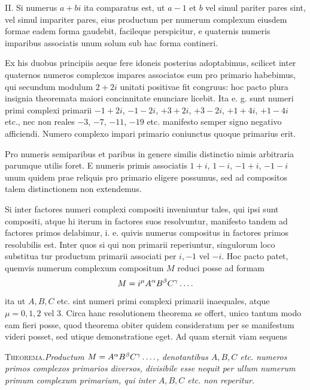 II. Si numerus $a+bi$ ita comparatus est, ut $a-1$ et $b$ vel simul pariter pares sint, vel simul impariter pares, eius productum per numerum complexum eiusdem formae eadem forma gaudebit, facileque perspicitur, e quaternis numeris imparibus associatis unum solum sub hac forma contineri.

Ex his duobus principiis aeque fere idoneis posterius adoptabimus, scilicet inter quaternos numeros complexos impares associatos eum pro primario habebimus, qui secundum modulum $2+2i$ unitati positivae fit congruus: hoc pacto plura insignia theoremata maiori concinnitate enunciare licebit. Ita e. g. sunt numeri primi complexi primarii $-1+2i$, $-1-2i$, $+3+2i$, $+3-2i$, $+1+4i$, $+1-4i$ etc., nec non reales $-3$, $-7$, $-11$, $-19$ etc. manifesto semper signo negativo afficiendi. Numero complexo impari primario coniunctus quoque primarius erit.

Pro numeris semiparibus et paribus in genere similis distinctio nimis arbitraria parumque utilis foret. E numeris primis associatis $1+i$, $1-i$, $-1+i$, $-1-i$ unum quidem prae reliquis pro primario eligere possumus, sed ad compositos talem distinctionem non extendemus.

Si inter factores numeri complexi compositi inveniuntur tales, qui ipsi sunt compositi, atque hi iterum in factores suos resolvuntur, manifesto tandem ad factores primos delabimur, i. e. quivis numerus compositus in factores primos resolubilis est. Inter quos si qui non primarii reperiuntur, singulorum loco substitua%
%
tur productum primarii associati per $i,-1$ vel $-i$. Hoc pacto patet, quemvis numerum complexum compositum $M$ reduci posse ad formam
\[
M=i^\mu A^\alpha B^\beta C^\gamma\mathinner{.\,.\,.\,.}
\]
ita ut $A,B,C$ etc. sint numeri primi complexi primarii inaequales, atque $\mu=0,1,2$ vel $3$. Circa hanc resolutionem theorema se offert, unico tantum modo eam fieri posse, quod theorema obiter quidem consideratum per se manifestum videri posset, sed utique demonstratione eget. Ad quam sternit viam sequens

\textsc{Theorema.}\quad\emph{Productum $M=A^\alpha B^\beta C^\gamma\mathinner{.\,.\,.\,.}$, denotantibus $A,B,C$ etc. numeros primos complexos primarios diversos, divisibile esse nequit per ullum numerum primum complexum primarium, qui inter $A,B,C$ etc. non reperitur.}

